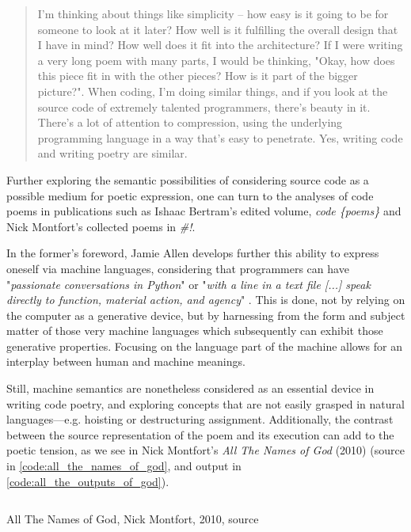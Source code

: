 \begin{quote}
  I'm thinking about things like simplicity -- how easy is it going to be for someone to look at it later? How well is it fulfilling the overall design that I have in mind? How well does it fit into the architecture? If I were writing a very long poem with many parts, I would be thinking, "Okay, how does this piece fit in with the other pieces? How is it part of the bigger picture?". When coding, I'm doing similar things, and if you look at the source code of extremely talented programmers, there's beauty in it. There's a lot of attention to compression, using the underlying programming language in a way that's easy to penetrate. Yes, writing code and writing poetry are similar.  \citep{jeiss_poetry_2002}
\end{quote}

Further exploring the semantic possibilities of considering source code as a possible medium for poetic expression, one can turn to the analyses of code poems in publications such as Ishaac Bertram's edited volume, \emph{code \{poems\}} and Nick Montfort's collected poems in \emph{\#!}.

In the former's foreword, Jamie Allen develops further this ability to express oneself via machine languages, considering that programmers can have "\emph{passionate conversations in Python}" or "\emph{with a line in a text file [...] speak directly to function, material action, and agency}" \citep{bertram_code_2012}. This is done, not by relying on the computer as a generative device, but by harnessing from the form and subject matter of those very machine languages which subsequently can exhibit those generative properties. Focusing on the language part of the machine allows for an interplay between human and machine meanings.

Still, machine semantics are nonetheless considered as an essential device in writing code poetry, and exploring concepts that are not easily grasped in natural languages—e.g. hoisting or destructuring assignment. Additionally, the contrast between the source representation of the poem and its execution can add to the poetic tension, as we see in Nick Montfort's \emph{All The Names of God} (2010) (source in \ref{code:all_the_names_of_god}, and output in \ref{code:all_the_outputs_of_god}).

\begin{listing}
\inputminted{perl}{./corpus/all_the_names_of_god.pl}
  \caption{All The Names of God, Nick Montfort, 2010, source}
  \label{code:all_the_names_of_god}
\end{listing}

